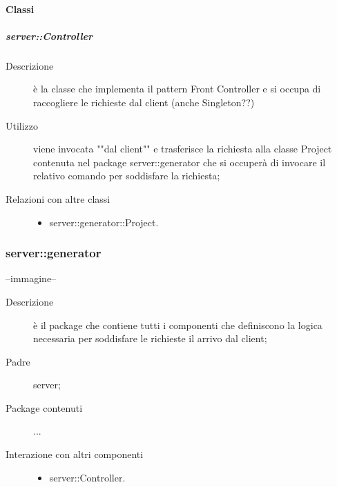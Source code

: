 \paragraph{Classi}
\subparagraph{server::Controller}
\begin{description}
\item[Descrizione] è la classe che implementa il pattern Front Controller e si occupa di raccogliere le richieste dal client (anche Singleton??)
\item[Utilizzo] viene invocata ""dal client"" e trasferisce la richiesta alla classe Project contenuta nel package server::generator che si occuperà di invocare il relativo comando per soddisfare la richiesta; 
\item[Relazioni con altre classi] 
	\begin{itemize}
	\item server::generator::Project.
	\end{itemize}
\end{description}

\subsubsection{server::generator}
--immagine--
\begin{description}
\item[Descrizione] è il package che contiene tutti i componenti che definiscono la logica necessaria per soddisfare le richieste il arrivo dal client;
\item[Padre] server; 
\item[Package contenuti]
	\begin{itemize}
	...
	\end{itemize}
\item[Interazione con altri componenti] 
	\begin{itemize}
	\item server::Controller.
	\end{itemize}
\end{description}